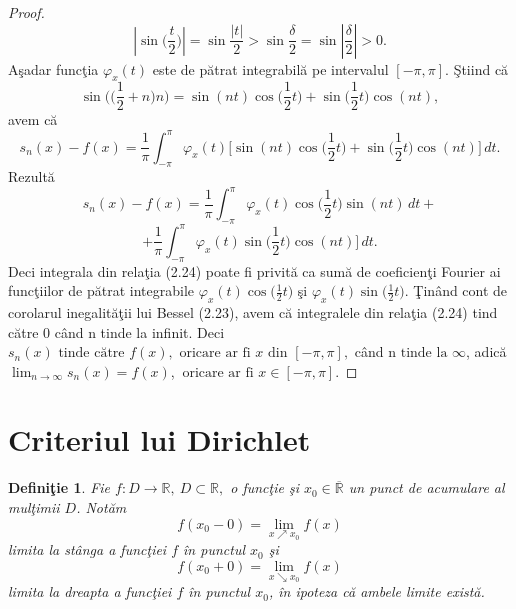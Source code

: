 \documentclass[a4paper,openany,12pt]{report}
\newtheorem{definition}{Defini\c tie}[section]
\begin{document}
\begin{proof}
\begin{equation*}
\left|\sin\Big(\frac{t}{2}\Big)\right| = \sin \frac{\left|t\right|}{2} > \sin\frac{\delta}{2}=\sin \left|\frac{\delta}{2}\right| > 0.
\end{equation*}
A\c sadar func\c tia $\varphi_x(t)$ este de p\u atrat integrabil\u a pe intervalul $[-\pi, \pi]$. \c Stiind c\u a
\begin{equation*}
\sin\Big(\Big(\frac{1}{2}+n\Big)n\Big) = \sin(nt)\cos\Big(\frac{1}{2}t\Big) + \sin\Big(\frac{1}{2}t\Big)\cos(nt), 
\end{equation*}
avem c\u a
\begin{equation*}
s_n(x) - f(x) = \frac{1}{\pi} \int_{-\pi}^{\pi} \varphi_x(t)\Big[ \sin(nt)\cos\Big(\frac{1}{2}t\Big) + \sin\Big(\frac{1}{2}t\Big)\cos(nt)\Big]\,dt.
\end{equation*}
Rezult\u a
\begin{equation*}
s_n(x) - f(x) = \frac{1}{\pi} \int_{-\pi}^{\pi} \varphi_x(t)\cos\Big(\frac{1}{2}t\Big) \sin(nt)\,dt +
\end{equation*}
\begin{equation}
+ \frac{1}{\pi} \int_{-\pi}^{\pi} \varphi_x(t) \sin\Big(\frac{1}{2}t\Big)\cos(nt)\Big]\,dt.
\end{equation}
Deci integrala din rela\c tia (2.24) poate fi privit\u a ca sum\u a de coeficien\c ti Fourier ai func\c tiilor de p\u atrat integrabile $\varphi_x(t)\cos\Big(\frac{1}{2}t\Big)$ \c si $\varphi_x(t) \sin\Big(\frac{1}{2}t\Big)$. \c Tin\^ and cont de corolarul inegalit\u a\c tii lui Bessel (2.23), avem c\u a integralele din rela\c tia (2.24) tind c\u atre 0 c\^ and n tinde la infinit. Deci $s_n(x) \text{ tinde c\u atre } f(x), \text{ oricare ar fi } x \text{ din } [-\pi, \pi],$ c\^ and n $\text{tinde la } \infty$, adic\u a $\displaystyle{\lim_{n\to\infty} }{s_n(x)} = f(x)$, $\: \text{oricare ar fi } x\in[-\pi, \pi]$.
\end{proof}



\section{Criteriul lui Dirichlet}
\begin{definition} Fie $f:D\rightarrow\mathbb{R}, \: D\subset\mathbb{R},$ o func\c tie \c si $x_0\in\overline{\mathbb{R}}$ un punct de acumulare al mul\c timii $D$. Not\u am
\begin{equation*}
f(x_0-0) = \lim_{x\nearrow x_0}f(x)
\end{equation*}
limita la st\^ anga a func\c tiei $f$ \^ in punctul $x_0$ \c si
\begin{equation*}
f(x_0+0) = \lim_{x\searrow x_0}f(x)
\end{equation*}
limita la dreapta a func\c tiei $f$ \^ in punctul $x_0$, \^ in ipoteza c\u a ambele limite exist\u a.
\end{definition}
\end{document}
